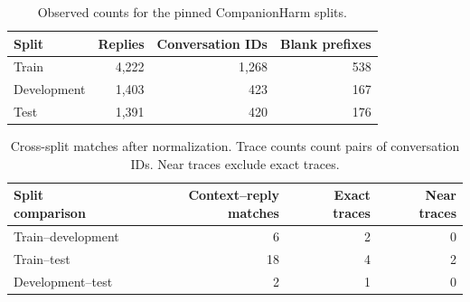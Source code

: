 \begin{table}[htbp]
\centering
\caption{Observed counts for the pinned CompanionHarm splits.}
\begin{tabular}{lrrr}
\toprule
Split & Replies & Conversation IDs & Blank prefixes \\
\midrule
Train & 4,222 & 1,268 & 538 \\
Development & 1,403 & 423 & 167 \\
Test & 1,391 & 420 & 176 \\
\bottomrule
\end{tabular}
\end{table}

\begin{table}[htbp]
\centering
\caption{Cross-split matches after normalization. Trace counts count pairs of conversation IDs. Near traces exclude exact traces.}
\begin{tabular}{lrrr}
\toprule
Split comparison & Context--reply matches & Exact traces & Near traces \\
\midrule
Train--development & 6 & 2 & 0 \\
Train--test & 18 & 4 & 2 \\
Development--test & 2 & 1 & 0 \\
\bottomrule
\end{tabular}
\end{table}
